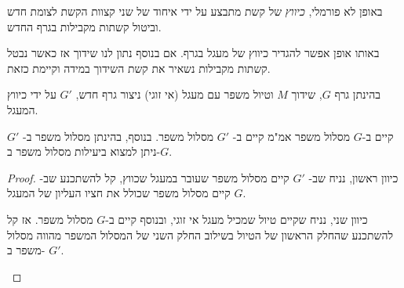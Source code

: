 באופן לא פורמלי,
\emph{כיווץ}
של קשת מתבצע על ידי איחוד של שני קצוות הקשת לצומת חדש וביטול קשתות מקבילות בגרף החדש.

באותו אופן אפשר להגדיר כיווץ של מעגל בגרף.
אם בנוסף נתון לנו שידוך אז כאשר נבטל קשתות מקבילות נשאיר את קשת השידוך במידה וקיימת כזאת.

בהינתן גרף $G$, שידוך $M$ וטיול משפר עם מעגל (אי זוגי) ניצור גרף חדש, 
$G'$
על ידי כיווץ המעגל.
\begin{claim}
קיים ב-$G$ מסלול משפר אמ"מ קיים ב-
$G'$
מסלול משפר.
בנוסף, בהינתן מסלול משפר ב-
$G'$
ניתן למצוא ביעילות מסלול משפר ב-$G$.
\end{claim}

\begin{proof}
כיוון ראשון, נניח שב-%
$G'$
קיים מסלול משפר שעובר במעגל שכווץ, 
קל להשתכנע שב-$G$ קיים מסלול משפר שכולל את חציו העליון של המעגל.

\begin{figure}[h]
\centering

\end{figure}
כיוון שני, נניח שקיים טיול שמכיל מעגל אי זוגי, ובנוסף קיים ב-$G$ מסלול משפר.
אז קל להשתכנע שהחלק הראשון של הטיול בשילוב החלק השני של המסלול המשפר מהווה מסלול משפר ב-%
$G'$.
\begin{figure}[h]
\centering

\end{figure}

\end{proof}

